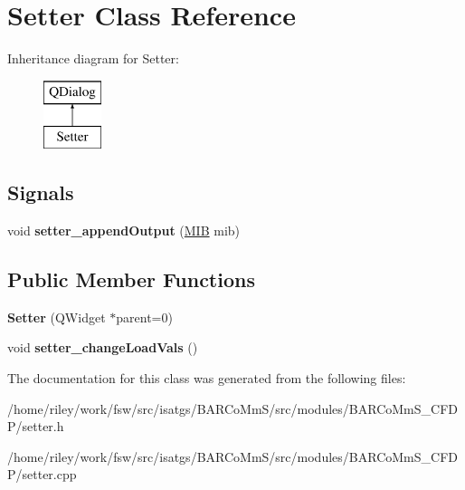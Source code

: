 \hypertarget{class_setter}{}\section{Setter Class Reference}
\label{class_setter}
Inheritance diagram for Setter\+:\begin{figure}[H]
\begin{center}
\leavevmode
\includegraphics[height=2.000000cm]{class_setter}
\end{center}
\end{figure}
\subsection*{Signals}
\begin{DoxyCompactItemize}
\item 
void {\bfseries setter\+\_\+append\+Output} (\hyperlink{struct_m_i_b}{M\+IB} mib)\hypertarget{class_setter_aa3c31dda34bdc33a77ab66ad1923c1cd}{}\label{class_setter_aa3c31dda34bdc33a77ab66ad1923c1cd}

\end{DoxyCompactItemize}
\subsection*{Public Member Functions}
\begin{DoxyCompactItemize}
\item 
{\bfseries Setter} (Q\+Widget $\ast$parent=0)\hypertarget{class_setter_a8d48648f19fb889b72572b529cce86c9}{}\label{class_setter_a8d48648f19fb889b72572b529cce86c9}

\item 
void {\bfseries setter\+\_\+change\+Load\+Vals} ()\hypertarget{class_setter_a16f30bad63779adfe155156f31a7ca3a}{}\label{class_setter_a16f30bad63779adfe155156f31a7ca3a}

\end{DoxyCompactItemize}


The documentation for this class was generated from the following files\+:\begin{DoxyCompactItemize}
\item 
/home/riley/work/fsw/src/isatgs/\+B\+A\+R\+Co\+Mm\+S/src/modules/\+B\+A\+R\+Co\+Mm\+S\+\_\+\+C\+F\+D\+P/setter.\+h\item 
/home/riley/work/fsw/src/isatgs/\+B\+A\+R\+Co\+Mm\+S/src/modules/\+B\+A\+R\+Co\+Mm\+S\+\_\+\+C\+F\+D\+P/setter.\+cpp\end{DoxyCompactItemize}
